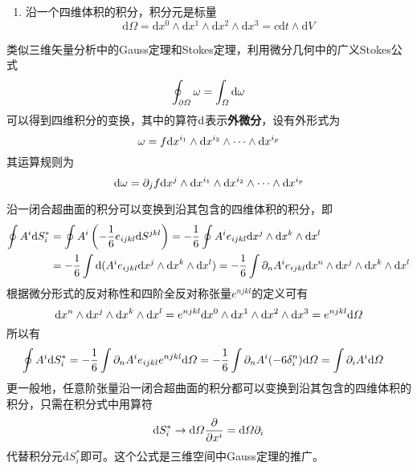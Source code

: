 \begin{enumerate}
\item 沿一个四维体积的积分，积分元是标量
\begin{equation}
	\mathrm{d}\varOmega = \mathrm{d}x^0 \wedge \mathrm{d}x^1 \wedge \mathrm{d}x^2 \wedge \mathrm{d}x^3 = c\mathrm{d}t \wedge \mathrm{d}V
\end{equation}
\end{enumerate}

类似三维矢量分析中的Gauss定理和Stokes定理，利用微分几何中的广义Stokes公式
\begin{equation}
	\oint_{\partial \varOmega} \omega = \int_\varOmega \mathrm{d} \omega
	\label{chapter1:广义Stokes公式}
\end{equation}
可以得到四维积分的变换，其中的算符$\mathrm{d}$表示{\bf 外微分}，设有外形式为
\begin{equation*}
	\omega = f\mathrm{d} x^{i_1} \wedge \mathrm{d} x^{i_2} \wedge \cdots \wedge \mathrm{d} x^{i_p}
\end{equation*}
其运算规则为
\begin{equation*}
	\mathrm{d} \omega = \partial_j f \mathrm{d} x^j \wedge \mathrm{d} x^{i_1} \wedge \mathrm{d} x^{i_2} \wedge \cdots \wedge \mathrm{d} x^{i_p}
\end{equation*}

沿一闭合超曲面的积分可以变换到沿其包含的四维体积的积分，即
\begin{align*}
	\oint A^i \mathrm{d} S^*_i & = \oint A^i\left(-\frac16 e_{ijkl} \mathrm{d} S^{jkl}\right) = -\frac16 \oint A^ie_{ijkl} \mathrm{d} x^j \wedge \mathrm{d} x^k \wedge \mathrm{d} x^l \\
	& = -\frac16 \int \mathrm{d} (A^ie_{ijkl} \mathrm{d} x^j \wedge \mathrm{d} x^k \wedge \mathrm{d} x^l) = -\frac16 \int \partial_n A^ie_{ijkl} \mathrm{d} x^n \wedge \mathrm{d} x^j \wedge \mathrm{d} x^k \wedge \mathrm{d} x^l
\end{align*}
根据微分形式的反对称性和四阶全反对称张量$e^{njkl}$的定义可有
\begin{equation*}
	\mathrm{d} x^n \wedge \mathrm{d} x^j \wedge \mathrm{d} x^k \wedge \mathrm{d} x^l = e^{njkl} \mathrm{d} x^0\wedge \mathrm{d} x^1\wedge \mathrm{d} x^2\wedge \mathrm{d} x^3 = e^{njkl} \mathrm{d} \varOmega
\end{equation*}
所以有
\begin{align*}
	\oint A^i \mathrm{d} S^*_i & = -\frac16 \int \partial_n A^ie_{ijkl}e^{njkl} \mathrm{d} \varOmega = -\frac16 \int\partial_n A^i (-6\delta^n_i) \mathrm{d} \varOmega = \int \partial_iA^i \mathrm{d} \varOmega
\end{align*}
更一般地，任意阶张量沿一闭合超曲面的积分都可以变换到沿其包含的四维体积的积分，只需在积分式中用算符
\begin{equation}
	\mathrm{d}S^*_i \to \mathrm{d}\varOmega \frac{\partial}{\partial x^i} = \mathrm{d}\varOmega \partial_i
\end{equation}
代替积分元$\mathrm{d}S^*_i$即可。这个公式是三维空间中Gauss定理的推广。

